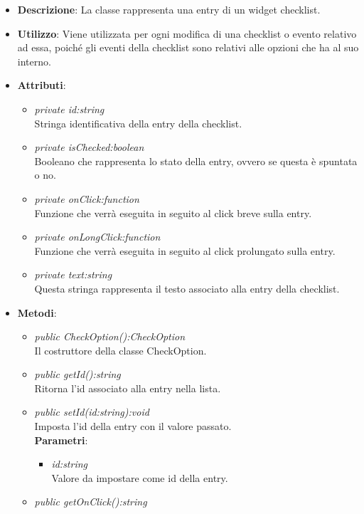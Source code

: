 \begin{itemize}
\item \textbf{Descrizione}: La classe rappresenta una entry di un widget checklist.
\item \textbf{Utilizzo}: Viene utilizzata per ogni modifica di una checklist o evento relativo ad essa, poiché gli eventi della checklist sono relativi alle opzioni che ha al suo interno.
\item \textbf{Attributi}:
	\begin{itemize}
	\item \textit{private id:string}\\
	Stringa identificativa della entry della checklist.
	\item \textit{private isChecked:boolean}\\
	Booleano che rappresenta lo stato della entry, ovvero se questa è spuntata o no.
	\item \textit{private onClick:function}\\
	Funzione che verrà eseguita in seguito al click breve sulla entry.
	\item \textit{private onLongClick:function}\\
	Funzione che verrà eseguita in seguito al click prolungato sulla entry.
	\item \textit{private text:string}\\
	Questa stringa rappresenta il testo associato alla entry della checklist.
	\end{itemize}
\item \textbf{Metodi}:
	\begin{itemize}
	\item \textit{public CheckOption():CheckOption}\\
	Il costruttore della classe CheckOption.
	\item \textit{public getId():string}\\
	Ritorna l'id associato alla entry nella lista.
	\item \textit{public setId(id:string):void}\\
	Imposta l'id della entry con il valore passato.
		\\ \textbf{Parametri}: \begin{itemize}
		\item \textit{id:string}\\
			Valore da impostare come id della entry.
		\end{itemize}
	\item \textit{public getOnClick():string}\\

\end{itemize}
\end{itemize}
